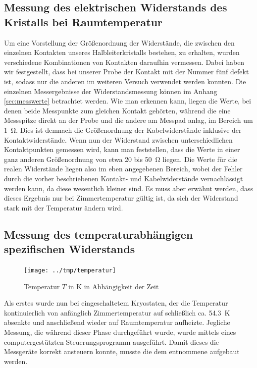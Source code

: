 \subsection{Messung des elektrischen Widerstands des Kristalls bei
Raumtemperatur}
Um eine Vorstellung der Größenordnung der Widerstände, die zwischen den
einzelnen Kontakten unseres Halbleiterkristalls bestehen, zu erhalten, wurden
verschiedene Kombinationen von Kontakten daraufhin vermessen. Dabei haben wir
festgestellt, dass bei unserer Probe der Kontakt mit der Nummer fünf defekt
ist, sodass nur die anderen im weiteren Versuch verwendet werden konnten. Die
einzelnen Messergebnisse der Widerstandsmessung können im Anhang
\ref{sec:messwerte} betrachtet werden. Wie man erkennen kann, liegen die
Werte, bei denen beide Messpunkte zum gleichen Kontakt gehörten, während die
eine Messspitze direkt an der Probe und die andere am Messpad anlag, im Bereich
um \SI{1}{\ohm}. Dies ist demnach die Größenordnung der Kabelwiderstände
inklusive der Kontaktwiderstände. Wenn nun der Widerstand zwischen
unterschiedlichen Kontaktpunkten gemessen wird, kann man feststellen, dass die 
Werte in einer ganz anderen Größenordnung von etwa 20 bis \SI{50}{\ohm} liegen.
Die Werte für die realen Widerstände liegen also im eben angegebenen Bereich,
wobei der Fehler durch die vorher beschriebenen Kontakt- und Kabelwiderstände
vernachlässigt werden kann, da diese wesentlich kleiner sind. Es muss aber
erwähnt werden, dass dieses Ergebnis nur bei Zimmertemperatur gültig ist, da
sich der Widerstand stark mit der Temperatur ändern wird.

\subsection{Messung des temperaturabhängigen spezifischen Widerstands}

\begin{figure}[htb]
   \centering
   \texttt{[image: ../tmp/temperatur]}
   \caption{Temperatur $T$ in K in Abhängigkeit der Zeit}
   \label{fig:temp}
\end{figure}

Als erstes wurde nun bei eingeschaltetem Kryostaten, der die Temperatur
kontinuierlich von anfänglich Zimmertemperatur auf schließlich ca.
\SI{54,3}{\kelvin} absenkte und anschließend wieder auf Raumtemperatur
aufheizte. Jegliche Messung, die während dieser Phase durchgeführt wurde, wurde
mittels eines computergestützten Steuerungsprogramm ausgeführt. Damit dieses
die Messgeräte korrekt ansteuern konnte, musste die dem \cite{script} entnommene
 aufgebaut werden.

